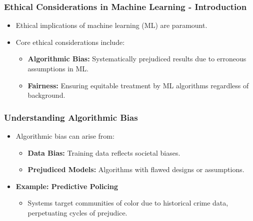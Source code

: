 \documentclass[aspectratio=169]{beamer}
\begin{document}
\begin{frame}[fragile]
    \frametitle{Ethical Considerations in Machine Learning - Introduction}
    \begin{itemize}
        \item Ethical implications of machine learning (ML) are paramount.
        \item Core ethical considerations include:
            \begin{itemize}
                \item \textbf{Algorithmic Bias:} Systematically prejudiced results due to erroneous assumptions in ML.
                \item \textbf{Fairness:} Ensuring equitable treatment by ML algorithms regardless of background.
            \end{itemize}
    \end{itemize}
\end{frame}

\begin{frame}[fragile]
    \frametitle{Understanding Algorithmic Bias}
    \begin{itemize}
        \item Algorithmic bias can arise from:
            \begin{itemize}
                \item \textbf{Data Bias:} Training data reflects societal biases.
                \item \textbf{Prejudiced Models:} Algorithms with flawed designs or assumptions.
            \end{itemize}
        \item \textbf{Example: Predictive Policing}
            \begin{itemize}
                \item Systems target communities of color due to historical crime data, perpetuating cycles of prejudice.
            \end{itemize}
    \end{itemize}
\end{frame}
\end{document}
